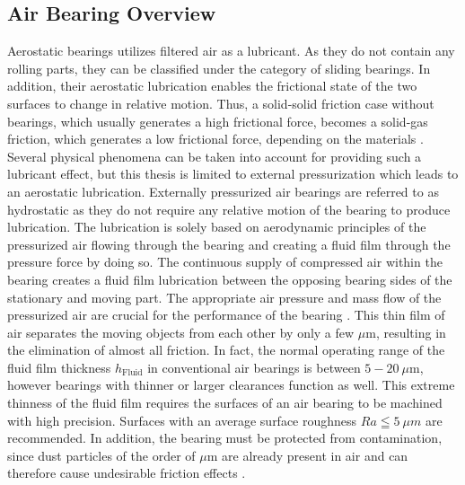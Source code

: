 \subsection{Air Bearing Overview}
\label{sec:Airbearingoverview}
Aerostatic bearings utilizes filtered air as a lubricant. As they do not contain any rolling parts, they can be classified under the category of sliding bearings. In addition, their aerostatic lubrication enables the frictional state of the two surfaces to change in relative motion. Thus, a solid-solid friction case without bearings, which usually generates a high frictional force, becomes a solid-gas friction, which generates a low frictional force, depending on the materials \cite{Qiu.2017}. \\
Several physical phenomena can be taken into account for providing such a lubricant effect, but this thesis is limited to external pressurization which leads to an aerostatic lubrication. Externally pressurized air bearings are referred to as hydrostatic as they do not require any relative motion of the bearing to produce lubrication. The lubrication is solely based on aerodynamic principles of the pressurized air flowing through the bearing and creating a fluid film through the pressure force by doing so.
The continuous supply of compressed air within the bearing creates a fluid film lubrication between the opposing bearing sides of the stationary and moving part. The appropriate air pressure and mass flow of the pressurized air are crucial for the performance of the bearing \cite{Bartz.2014}\cite{Slocum.1992}.
This thin film of air separates the moving objects from each other by only a few $\mu$m, resulting in the elimination of almost all friction. In fact, the normal operating range of the fluid film thickness $h_\text{Fluid}$  in conventional air bearings is between $5- 20 \ \mu$m, however bearings with thinner or larger clearances function as well. This extreme thinness of the fluid film requires the surfaces of an air bearing to be machined with high precision. Surfaces with an average surface roughness $Ra \leqq 5 \ \mu m$ are recommended. In addition, the bearing must be protected from contamination, since dust particles of the order of $\mu$m are already present in air and can therefore cause undesirable friction effects \cite{Hamrock.1991}\cite{Gao.2019}.
